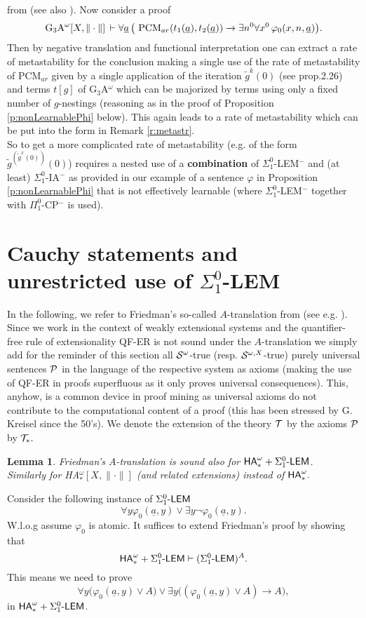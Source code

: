\documentclass[1p]{elsarticle}
\newcommand{\usftext}[1]{\textsf{\upshape #1}}
\newcommand{\ha}{\ensuremath{{\usftext{HA}}^\omega}} %
\newcommand{\LEM}{\ensuremath{\Sigma^0_1\usftext{-LEM}}}
\newcommand{\tup}{\underline} %
\theoremstyle{plain}
\newtheorem{lemma}[thm]{Lemma}
\theoremstyle{definition}
\theoremstyle{remark}
\renewenvironment{proof}[1][]{\noindent{\bf Proof{#1}. }}{\nopagebreak[4]{\hspace*{\fill}
  $\Box$              %
 }{\vspace{2ex}}}
\renewcommand{\phi}{\varphi}
\theoremstyle{definition}
\begin{document}
{from \cite{Kohlenbach(lowrate)} (see also \cite{Kohlenbach(book)}).
Now consider a proof 
\[\mbox{\rm G$_3$A}^{\omega}[X,\|\cdot\|]\,
\vdash   
\forall \underline{a}\, \big( 
\ \mbox{\rm PCM}_{ar}(t_1(\underline{a}),
t_2(\underline{a}))
 \rightarrow \exists n^0\forall x^0\,\varphi_0(x,n,\underline{a})\big).  \] 
Then by negative translation and functional interpretation one can 
extract a rate of metastability for the conclusion 
making a single use of the rate of 
metastability of PCM$_{ar}$ given by a single application of the iteration 
$\tilde{g}^{k}(0)$ (see \cite{Kohlenbach(book)} prop.2.26) 
and terms $t[g]$ of G$_3$A$^{\omega}$ which can be 
majorized by terms using only a fixed number of $g$-nestings (reasoning 
as in the proof of Proposition \ref{p:nonLearnablePhi} below). 
This again leads to a rate of 
metastability which can be put into the form in Remark \ref{r:metastr}.\\[1mm] 
So to get a more complicated rate of metastability (e.g. of the form 
$\tilde{g}^{(\tilde{g}^x(0))}(0)$) requires a nested use of a {\bf combination} of 
$\Sigma^0_1$-LEM$^-$ and (at least) 
$\Sigma^0_1$-IA$^-$ as provided in our example 
of a sentence $\varphi$ in Proposition 
\ref{p:nonLearnablePhi} that is not effectively learnable (where 
$\Sigma^0_1$-LEM$^-$ together with $\Pi^0_1$-CP$^-$ is used).
 

\section{Cauchy statements and unrestricted use of $\Sigma^0_1$-LEM}
In the following, we refer to Friedman's so-called $A$-translation from 
\cite{Friedman(78)} (see e.g. \cite{Kohlenbach(book)}). Since we 
work in the context of weakly extensional systems and the quantifier-free 
rule of extensionality QF-ER is not sound under the $A$-translation we simply 
add for the reminder of this section 
all ${\cal S}^{\omega}$-true (resp. ${\cal S}^{\omega,X}$-true) purely 
universal sentences ${\cal P}$ in the language of the respective system 
as axioms (making the use of QF-ER in proofs superfluous as it only proves 
universal consequences). This, anyhow, is a common device in proof mining 
as universal axioms do not contribute to the computational content of a 
proof (this has been stressed by G. Kreisel since the 50's). We denote 
the extension of the theory ${\cal T}$ by the axioms ${\cal P}$ by 
${\cal T}_*.$ 

\begin{lemma}\label{l:Atrans+}
Friedman's $A$-translation is sound also for $\ha_* + \LEM$.\\ Similarly for 
{\rm HA$_*^{\omega}[X,\|\cdot\|]$} (and related extensions) instead of 
$\ha_*.$
\end{lemma}
\begin{proof}
Consider the following instance of $\LEM$
\[\forall y \phi_0(\tup a,y)  \vee \exists y \neg\phi_0(\tup a,y).\] 
W.l.o.g assume $\phi_0$ is atomic. 
It suffices to extend Friedman's proof by showing that
\[\ha_* + \LEM\vdash (\LEM)^A.\]
This means we need to prove
\[ \forall y \big( \phi_0(\tup a,y) \vee A\big) \vee \exists y \big(  (\phi_0(\tup a,y) \vee A) \rightarrow A\big),\tag{1}\]
in $\ha_* + \LEM$.


\end{proof}}
\end{document}
